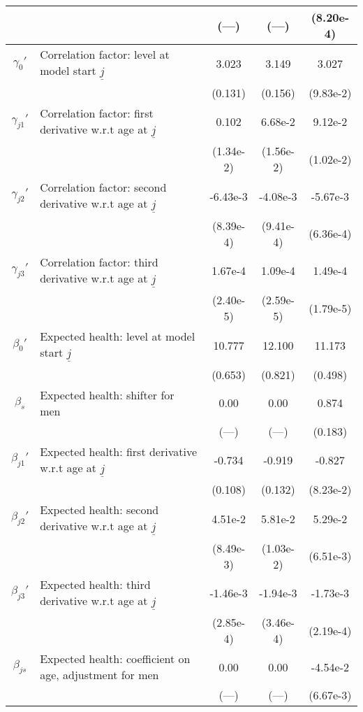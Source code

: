 \begin{table}
\begin{center}
{\begin{tabular}{clccc}
\rule{0pt}{2.2ex} & & (---) & (---) & (8.20e-4) \\
\hline
\rule{0pt}{2.2ex}$\gamma_{0}'$ & Correlation factor: level at model start $\underline{j}$ & 3.023 & 3.149 & 3.027 \\
\rule{0pt}{2.2ex} & & (0.131) & (0.156) & (9.83e-2) \\
\rule{0pt}{2.2ex}$\gamma_{j1}'$ & Correlation factor: first derivative w.r.t age at $\underline{j}$ & 0.102 & 6.68e-2 & 9.12e-2 \\
\rule{0pt}{2.2ex} & & (1.34e-2) & (1.56e-2) & (1.02e-2) \\
\rule{0pt}{2.2ex}$\gamma_{j2}'$ & Correlation factor: second derivative w.r.t age at $\underline{j}$ & -6.43e-3 & -4.08e-3 & -5.67e-3 \\
\rule{0pt}{2.2ex} & & (8.39e-4) & (9.41e-4) & (6.36e-4) \\
\rule{0pt}{2.2ex}$\gamma_{j3}'$ & Correlation factor: third derivative w.r.t age at $\underline{j}$ & 1.67e-4 & 1.09e-4 & 1.49e-4 \\
\rule{0pt}{2.2ex} & & (2.40e-5) & (2.59e-5) & (1.79e-5) \\
\hline
\rule{0pt}{2.2ex}$\beta_{0}'$ & Expected health: level at model start $\underline{j}$ & 10.777 & 12.100 & 11.173 \\
\rule{0pt}{2.2ex} & & (0.653) & (0.821) & (0.498) \\
\rule{0pt}{2.2ex}$\beta_{s}$ & Expected health: shifter for men & 0.00 & 0.00 & 0.874 \\
\rule{0pt}{2.2ex} & & (---) & (---) & (0.183) \\
\rule{0pt}{2.2ex}$\beta_{j1}'$ & Expected health: first derivative w.r.t age at $\underline{j}$ & -0.734 & -0.919 & -0.827 \\
\rule{0pt}{2.2ex} & & (0.108) & (0.132) & (8.23e-2) \\
\rule{0pt}{2.2ex}$\beta_{j2}'$ & Expected health: second derivative w.r.t age at $\underline{j}$ & 4.51e-2 & 5.81e-2 & 5.29e-2 \\
\rule{0pt}{2.2ex} & & (8.49e-3) & (1.03e-2) & (6.51e-3) \\
\rule{0pt}{2.2ex}$\beta_{j3}'$ & Expected health: third derivative w.r.t age at $\underline{j}$ & -1.46e-3 & -1.94e-3 & -1.73e-3 \\
\rule{0pt}{2.2ex} & & (2.85e-4) & (3.46e-4) & (2.19e-4) \\
\rule{0pt}{2.2ex}$\beta_{js}$ & Expected health: coefficient on age, adjustment for men & 0.00 & 0.00 & -4.54e-2 \\
\rule{0pt}{2.2ex} & & (---) & (---) & (6.67e-3) \\

\end{tabular}}
\end{center}
\end{table}
